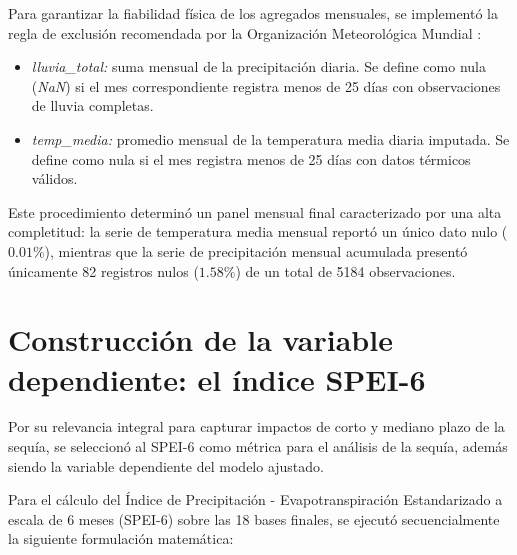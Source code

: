 Para garantizar la fiabilidad física de los agregados mensuales, se implementó la regla de exclusión recomendada por la Organización Meteorológica Mundial \cite{wmo2017}:
\begin{itemize}
    \item \textit{lluvia\_total:} suma mensual de la precipitación diaria. Se define como nula (\textit{NaN}) si el mes correspondiente registra menos de 25 días con observaciones de lluvia completas.
    \item \textit{temp\_media:} promedio mensual de la temperatura media diaria imputada. Se define como nula si el mes registra menos de 25 días con datos térmicos válidos.
\end{itemize}

Este procedimiento determinó un panel mensual final caracterizado por una alta completitud: la serie de temperatura media mensual reportó un único dato nulo ($0.01\%$), mientras que la serie de precipitación mensual acumulada presentó únicamente 82 registros nulos ($1.58\%$) de un total de 5184 observaciones.

\section{Construcción de la variable dependiente: el índice SPEI-6}

Por su relevancia integral para capturar impactos de corto y mediano plazo de la sequía, se seleccionó al SPEI-6 como métrica para el análisis de la sequía, además siendo la variable dependiente del modelo ajustado.

Para el cálculo del Índice de Precipitación - Evapotranspiración Estandarizado a escala de 6 meses (SPEI-6) sobre las 18 bases finales, se ejecutó secuencialmente la siguiente formulación matemática:

